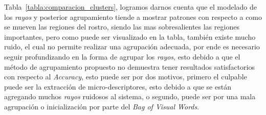 Tabla~\ref{tabla:comparacion_clusters}, logramos darnos cuenta que el modelado de los \textit{rayos} y posterior agrupamiento tiende a mostrar patrones con respecto a como se mueven las regiones del rostro, siendo las mas sobresalientes las regiones importantes, pero como puede ser visualizado en la tabla, también existe mucho ruido, el cual no permite realizar una agrupación adecuada, por ende es necesario seguir profundizando en la forma de agrupar los \textit{rayos}, esto debido a que el método de agrupamiento propuesto no demuestra tener resultados satisfactorios con respecto al \textit{Accuracy}, esto puede ser por dos motivos, primero el culpable puede ser la extracción de micro-descriptores, esto debido a que se están agregando muchos \textit{rayos} ruidosos al sistema, o segundo, puede ser por una mala agrupación o inicialización por parte del \textit{Bag of Visual Words}.




